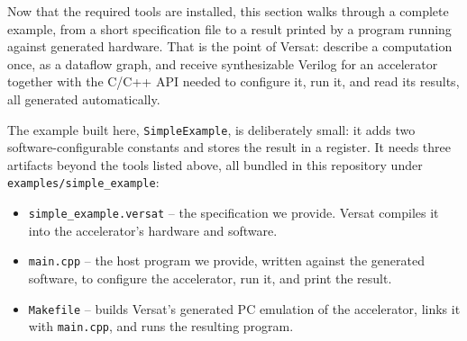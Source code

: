 %

Now that the required tools are installed, this section walks through a complete example, from a short specification file to a result printed by a program running against generated hardware. That is the point of Versat: describe a computation once, as a dataflow graph, and receive synthesizable Verilog for an accelerator together with the C/C++ API needed to configure it, run it, and read its results, all generated automatically.

The example built here, \texttt{SimpleExample}, is deliberately small: it adds two software-configurable constants and stores the result in a register. It needs three artifacts beyond the tools listed above, all bundled in this repository under \texttt{examples/simple\_example}:

\begin{itemize}
  \itemsep-0.5em
  \item \texttt{simple\_example.versat} -- the specification we provide. Versat compiles it into the accelerator's hardware and software.
  \item \texttt{main.cpp} -- the host program we provide, written against the generated software, to configure the accelerator, run it, and print the result.
  \item \texttt{Makefile} -- builds Versat's generated PC emulation of the accelerator, links it with \texttt{main.cpp}, and runs the resulting program.
\end{itemize}

